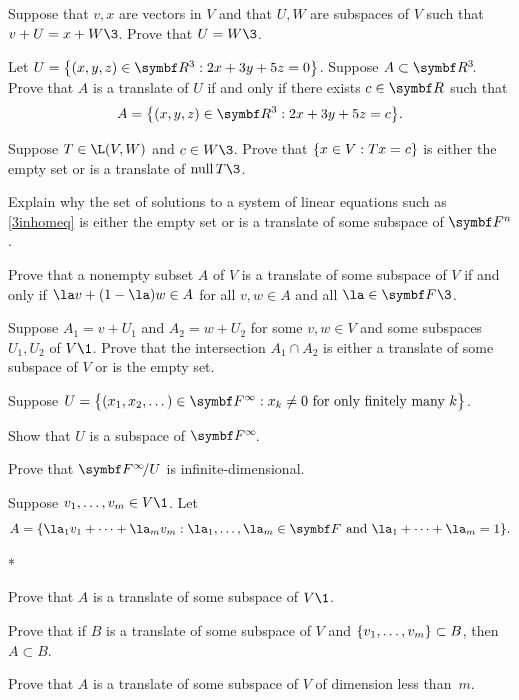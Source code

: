 \begin{exercises}
\exercise
Suppose that $v, x$ are vectors in $V$ and that $U, W$ are subspaces of $V$ such that $v + U = x + W\3$. Prove that $U = W\3$.


\exercise
Let $U = \br[\big]{ (x, y, z) \in \R3: 2x + 3y + 5z= 0}$. Suppose $A \subset \RR3$. Prove that $A$ is a translate of $U$ if and only if there exists $c \in \R{}$ such that\label{3translates}
\[
A = \br[\big]{ (x, y, z) \in \R3: 2x + 3y + 5z= c}.
\]
\exercisedisplayend


\exercise
\begin{SUBtheorem}
\item
Suppose $T \in \L(V, W)$ and $c \in W\3$. Prove that $\{x \in V : Tx = c\}$ is either the empty set or is a translate of
$\ker T\3$.

\item
Explain why the set of solutions to a system of linear equations such as \ref{3inhomeq} is either the empty set or is a translate of some subspace of $\FF n$.
\end{SUBtheorem}


\exercise
Prove that a nonempty subset $A$ of $V$ is a translate of some subspace of $V$ if and only if $\la v + (1-\la)w \in A$ for all $v, w \in A$ and all $\la \in \F{}\3$. \label{affine}


\exercise
Suppose $A_1 = v + U_1$ and $A_2 = w + U_2$ for some $v, w \in V$ and some subspaces $U_1, U_2$ of $V\1$. Prove that the intersection $A_1 \cap A_2$ is either a translate of some subspace of $V$ or is the empty set.

\pagebreak[4]


\exercise
Suppose $U = \br[\big]{(x_1, x_2, \dots) \in \F{\infty}: x_k \ne 0\ \text{for only finitely many}\ k}$.
\begin{subtheorem}
\item
Show that $U$ is a subspace of $\FF{\infty}$.
\item
Prove that $\FF{\infty}/U$ is infinite-dimensional.
\end{subtheorem}
\exercisesubtheoremend


\exercise
Suppose $v_1, \dots, v_m \in V\1$. Let
\[
A = \{ \la_1 v_1 + \dots + \la_m v_m : \la_1, \dots, \la_m \in \F{}\ \text{and}\ \la_1 + \dots + \la_m = 1 \}.
\]
\begin{subtheorem}*
\item
Prove that $A$ is a translate of some subspace of $V\1$.
\item
Prove that if $B$ is a translate of some subspace of $V$ and $\{v_1, \dots, v_m\} \subset B$, then $A \subset B$.
\item
Prove that $A$ is a translate of some subspace of $V$ of dimension less than~$m$.
\end{subtheorem}
\exercisesubtheoremend



\end{exercises}
